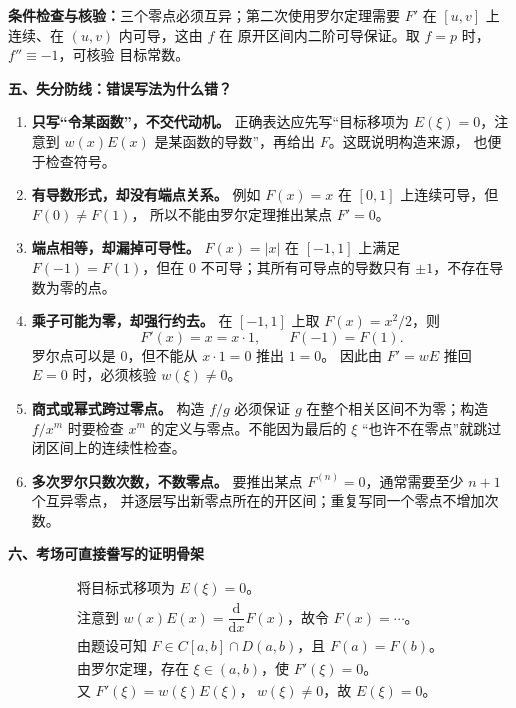 \begin{knowledgeBox}
\textbf{条件检查与核验：}三个零点必须互异；第二次使用罗尔定理需要
\(F'\) 在 \([u,v]\) 上连续、在 \((u,v)\) 内可导，这由 \(f\) 在
原开区间内二阶可导保证。取 \(f=p\) 时，\(f''\equiv-1\)，可核验
目标常数。

\textbf{五、失分防线：错误写法为什么错？}

\begin{enumerate}
  \item \textbf{只写“令某函数”，不交代动机。}
  正确表达应先写“目标移项为 \(E(\xi)=0\)，注意到
  \(w(x)E(x)\) 是某函数的导数”，再给出 \(F\)。这既说明构造来源，
  也便于检查符号。

  \item \textbf{有导数形式，却没有端点关系。}
  例如 \(F(x)=x\) 在 \([0,1]\) 上连续可导，但 \(F(0)\ne F(1)\)，
  所以不能由罗尔定理推出某点 \(F'=0\)。

  \item \textbf{端点相等，却漏掉可导性。}
  \(F(x)=|x|\) 在 \([-1,1]\) 上满足 \(F(-1)=F(1)\)，但在 \(0\)
  不可导；其所有可导点的导数只有 \(\pm1\)，不存在导数为零的点。

  \item \textbf{乘子可能为零，却强行约去。}
  在 \([-1,1]\) 上取 \(F(x)=x^2/2\)，则
  \[
  F'(x)=x=x\cdot1,\qquad F(-1)=F(1).
  \]
  罗尔点可以是 \(0\)，但不能从 \(x\cdot1=0\) 推出 \(1=0\)。
  因此由 \(F'=wE\) 推回 \(E=0\) 时，必须核验 \(w(\xi)\ne0\)。

  \item \textbf{商式或幂式跨过零点。}
  构造 \(f/g\) 必须保证 \(g\) 在整个相关区间不为零；构造
  \(f/x^m\) 时要检查 \(x^m\) 的定义与零点。不能因为最后的
  \(\xi\) “也许不在零点”就跳过闭区间上的连续性检查。

  \item \textbf{多次罗尔只数次数，不数零点。}
  要推出某点 \(F^{(n)}=0\)，通常需要至少 \(n+1\) 个互异零点，
  并逐层写出新零点所在的开区间；重复写同一个零点不增加次数。
\end{enumerate}

\textbf{六、考场可直接誊写的证明骨架}

\[
\begin{array}{l}
\text{将目标式移项为 }E(\xi)=0。\\
\text{注意到 }w(x)E(x)=\dfrac{\mathrm d}{\mathrm dx}F(x)，
\text{故令 }F(x)=\cdots。\\
\text{由题设可知 }F\in C[a,b]\cap D(a,b)，
\text{且 }F(a)=F(b)。\\
\text{由罗尔定理，存在 }\xi\in(a,b)\text{，使 }F'(\xi)=0。\\
\text{又 }F'(\xi)=w(\xi)E(\xi)，\ w(\xi)\ne0，
\text{故 }E(\xi)=0。
\end{array}
\]


\end{knowledgeBox}
